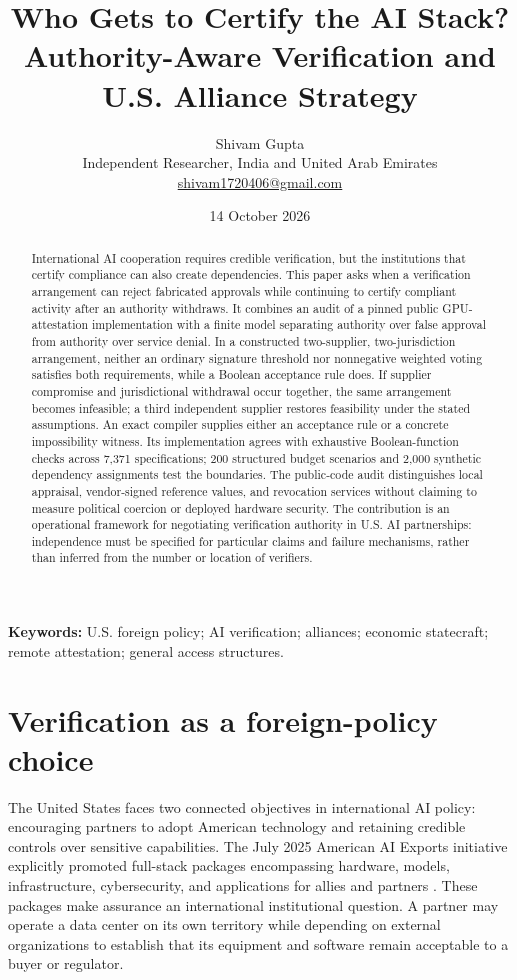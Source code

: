 \documentclass[11pt,letterpaper]{article}
\title{Who Gets to Certify the AI Stack?\\\large Authority-Aware Verification and U.S. Alliance Strategy}
\author{Shivam Gupta\\\small Independent Researcher, India and United Arab Emirates\\\small \href{mailto:shivam1720406@gmail.com}{shivam1720406@gmail.com}}
\date{14 October 2026}
\begin{document}
\maketitle
\begin{abstract}
International AI cooperation requires credible verification, but the institutions that certify compliance can also create dependencies. This paper asks when a verification arrangement can reject fabricated approvals while continuing to certify compliant activity after an authority withdraws. It combines an audit of a pinned public GPU-attestation implementation with a finite model separating authority over false approval from authority over service denial. In a constructed two-supplier, two-jurisdiction arrangement, neither an ordinary signature threshold nor nonnegative weighted voting satisfies both requirements, while a Boolean acceptance rule does. If supplier compromise and jurisdictional withdrawal occur together, the same arrangement becomes infeasible; a third independent supplier restores feasibility under the stated assumptions. An exact compiler supplies either an acceptance rule or a concrete impossibility witness. Its implementation agrees with exhaustive Boolean-function checks across 7,371 specifications; 200 structured budget scenarios and 2,000 synthetic dependency assignments test the boundaries. The public-code audit distinguishes local appraisal, vendor-signed reference values, and revocation services without claiming to measure political coercion or deployed hardware security. The contribution is an operational framework for negotiating verification authority in U.S. AI partnerships: independence must be specified for particular claims and failure mechanisms, rather than inferred from the number or location of verifiers.
\end{abstract}
\noindent\textbf{Keywords:} U.S. foreign policy; AI verification; alliances; economic statecraft; remote attestation; general access structures.

\section{Verification as a foreign-policy choice}
The United States faces two connected objectives in international AI policy: encouraging partners to adopt American technology and retaining credible controls over sensitive capabilities. The July 2025 American AI Exports initiative explicitly promoted full-stack packages encompassing hardware, models, infrastructure, cybersecurity, and applications for allies and partners \citep{exports}. These packages make assurance an international institutional question. A partner may operate a data center on its own territory while depending on external organizations to establish that its equipment and software remain acceptable to a buyer or regulator.
\end{document}
